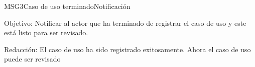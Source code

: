 \begin{mensaje}{MSG3}{Caso de uso terminado}{Notificación}
	\item [Objetivo:] Notificar al actor que ha terminado de registrar el caso de uso y este está listo para ser revisado.
	\item[Redacción:] El caso de uso ha sido registrado exitosamente. Ahora el caso de uso puede ser revisado
\end{mensaje}